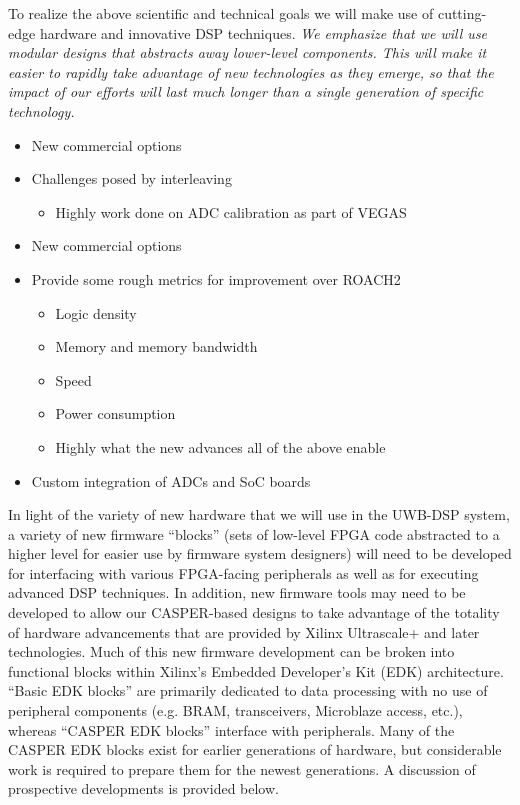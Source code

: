 \documentclass[10pt]{myNSF}
\begin{document}
To realize the above scientific and technical goals we will make use
of cutting-edge hardware and innovative DSP techniques.  \emph{We
  emphasize that we will use modular designs that abstracts away
  lower-level components.  This will make it easier to rapidly take
  advantage of new technologies as they emerge, so that the impact of
  our efforts will last much longer than a single generation of
  specific technology.}


\begin{itemize}
\item{New commercial options}
\item{Challenges posed by interleaving}
  \begin{itemize}
  \item{Highly work done on ADC calibration as part of VEGAS}
  \end{itemize}
\end{itemize}

\begin{itemize}
\item{New commercial options}
\item{Provide some rough metrics for improvement over ROACH2}
  \begin{itemize}
  \item{Logic density}
  \item{Memory and memory bandwidth}
  \item{Speed}
  \item{Power consumption}
  \item{Highly what the new advances all of the above enable}
  \end{itemize}
\item{Custom integration of ADCs and SoC boards}
\end{itemize}

\label{sec:firmware}

In light of the variety of new hardware that we will use in the
UWB-DSP system, a variety of new firmware ``blocks'' (sets of
low-level FPGA code abstracted to a higher level for easier use by
firmware system designers) will need to be developed for interfacing
with various FPGA-facing peripherals as well as for executing advanced
DSP techniques.  In addition, new firmware tools may need to be
developed to allow our CASPER-based designs to take advantage of the
totality of hardware advancements that are provided by Xilinx
Ultrascale+ and later technologies. Much of this new firmware
development can be broken into functional blocks within Xilinx’s
Embedded Developer's Kit (EDK) architecture. ``Basic EDK blocks'' are
primarily dedicated to data processing with no use of peripheral
components (e.g. BRAM, transceivers, Microblaze access, etc.), whereas
``CASPER EDK blocks'' interface with peripherals. Many of the CASPER
EDK blocks exist for earlier generations of hardware, but considerable
work is required to prepare them for the newest generations. A
discussion of prospective developments is provided below.
\end{document}
